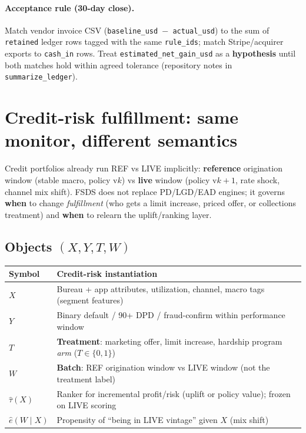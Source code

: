 \documentclass[11pt]{article}
\begin{document}
\paragraph{Acceptance rule (30-day close).}
Match vendor invoice CSV (\texttt{baseline\_usd $-$ actual\_usd}) to the sum of \texttt{retained} ledger rows tagged with the same \texttt{rule\_ids}; match Stripe/acquirer exports to \texttt{cash\_in} rows.
Treat \texttt{estimated\_net\_gain\_usd} as a \textbf{hypothesis} until both matches hold within agreed tolerance (repository notes in \texttt{summarize\_ledger}).

\section{Credit-risk fulfillment: same monitor, different semantics}
Credit portfolios already run REF vs LIVE implicitly: \textbf{reference} origination window (stable macro, policy v$k$) vs \textbf{live} window (policy v$k{+}1$, rate shock, channel mix shift).
FSDS does not replace PD/LGD/EAD engines; it governs \textbf{when} to change \emph{fulfillment} (who gets a limit increase, priced offer, or collections treatment) and \textbf{when} to relearn the uplift/ranking layer.

\subsection{Objects $(X,Y,T,W)$}
\begin{center}
\begin{tabular}{@{}ll@{}}
\toprule
Symbol & Credit-risk instantiation \\
\midrule
$X$ & Bureau + app attributes, utilization, channel, macro tags (segment features) \\
$Y$ & Binary default / 90+ DPD / fraud-confirm within performance window \\
$T$ & \textbf{Treatment}: marketing offer, limit increase, hardship program \emph{arm} ($T\in\{0,1\}$) \\
$W$ & \textbf{Batch}: REF origination window vs LIVE window (not the treatment label) \\
$\hat\tau(X)$ & Ranker for incremental profit/risk (uplift or policy value); frozen on LIVE scoring \\
$\hat e(W\mid X)$ & Propensity of ``being in LIVE vintage'' given $X$ (mix shift) \\
\bottomrule
\end{tabular}
\end{center}
\end{document}
